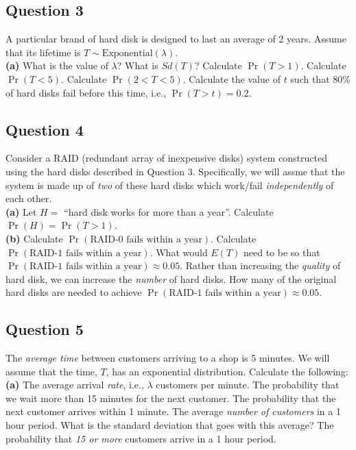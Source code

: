 \documentclass[12pt]{article}
\begin{document}
\subsection*{Question 3}
A particular brand of hard disk is designed to last an average of 2 years. Assume that its lifetime is $T \sim \text{Exponential}(\lambda)$.\\[-0.2cm]

{\bf(a)} What is the value of $\lambda$?  What is $Sd(T)$?  Calculate $\Pr(T > 1)$.   Calculate $\Pr(T < 5)$.  Calculate $\Pr(2 < T < 5)$.  Calculate the value of $t$ such that 80\% of hard disks fail before this time, i.e., $\Pr(T > t) = 0.2$.

\subsection*{Question 4}
Consider a RAID (redundant array of inexpensive disks) system constructed using the hard disks described in Question 3. Specifically, we will assme that the system is made up of \emph{two} of these hard disks which work/fail \emph{independently} of each other.\\[-0.2cm]

{\bf(a)} Let $H =$  ``hard disk works for more than a year''. Calculate $\Pr(H) = \Pr(T > 1)$. \quad \\{\bf(b)} Calculate $\Pr(\text{RAID-0 fails within a year})$.  Calculate $\Pr(\text{RAID-1 fails within a year})$.   What would $E(T)$ need to be so that $\Pr(\text{RAID-1 fails within a year}) \approx 0.05$.  Rather than increasing the \emph{quality} of hard disk, we can increase the \emph{number} of hard disks. How many of the original hard disks are needed to achieve $\Pr(\text{RAID-1 fails within a year}) \approx 0.05$.



\subsection*{Question 5}
The \emph{average time} between customers arriving to a shop is 5 minutes. We will assume that the time, $T$, has an exponential distribution. Calculate the following:\\[-0.2cm]

{\bf(a)} The average arrival \emph{rate}, i.e., $\lambda$ customers per minute.  The probability that we wait more than 15 minutes for the next customer.  The probability that the next customer arrives within 1 minute.  The average \emph{number of customers} in a 1 hour period. What is the standard deviation that goes with this average?  The probability that \emph{15 or more} customers arrive in a 1 hour period.
\end{document}
